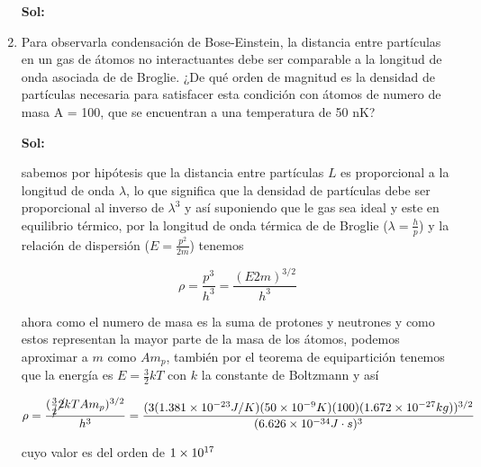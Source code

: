 \documentclass[12pt,a4paper]{article}
\begin{document}
\begin{enumerate}
    \textbf{Sol:}
    
    
    
    
    
    
    \item Para observarla condensación de Bose-Einstein, la distancia entre partículas en un gas de átomos no interactuantes debe ser comparable a la longitud de onda asociada de de Broglie. ¿De qué orden de magnitud es la densidad de partículas necesaria para satisfacer esta condición con átomos de numero de masa A = 100, que se encuentran a una temperatura de 50 nK?
    
    \textbf{Sol:}
    
    sabemos por hipótesis que la distancia entre partículas $L$ es proporcional a la longitud de onda $\lambda$, lo que significa que la densidad de partículas debe ser proporcional al inverso de $\lambda^3$ y así suponiendo que le gas sea ideal y este en equilibrio térmico, por la longitud de onda térmica de de Broglie ($\lambda = \frac{h}{p}$) y la relación de dispersión ($E = \frac{p^2}{2m}$) tenemos
    
    \begin{equation*}
        \rho = \frac{p^3}{h^3} = \frac{(E2m)^{3/2}}{h^3}
    \end{equation*}
    
    ahora como el numero de masa es la suma de protones y neutrones y como estos representan la mayor parte de la masa de los átomos, podemos aproximar a $m$ como $Am_p$, también por el teorema de equipartición tenemos que la energía  es $E = \frac{3}{2}k T$ con $k$ la constante de Boltzmann y así
    
    \begin{equation*}
        \rho = \frac{(\frac{3}{\cancel{2}}\cancel{2}k TA m_p)^{3/2}}{h^3} = \frac{(3(\num{1.381 e -23 }J/K)(\num{50 e-9}K)(100)(\num{1.672 e -27} kg))^{3/2}}{(\num{6.626 e -34}J \cdot s)^{3}}
    \end{equation*}
    
    cuyo valor es del orden de $\num{1 e 17}$
    
    
\end{enumerate}
\end{document}
